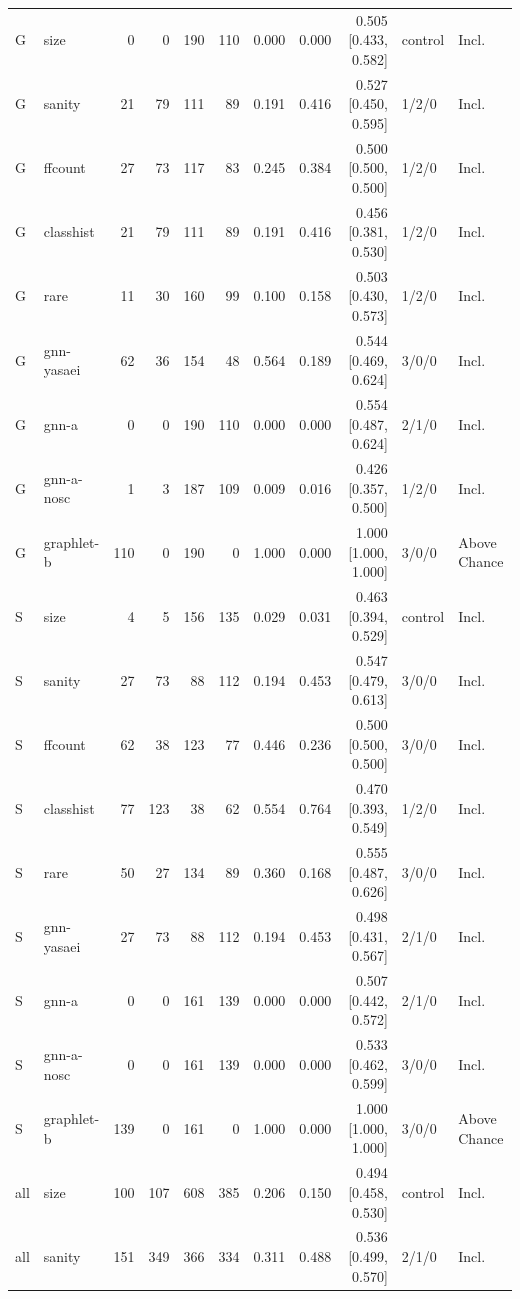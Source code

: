 \begin{tabular}{@{}llrrrrrrrll@{}}
\midrule
G & size & 0 & 0 & 190 & 110 & 0.000 & 0.000 & 0.505 [0.433, 0.582] & control & Incl. \\
G & sanity & 21 & 79 & 111 & 89 & 0.191 & 0.416 & 0.527 [0.450, 0.595] & 1/2/0 & Incl. \\
G & ffcount & 27 & 73 & 117 & 83 & 0.245 & 0.384 & 0.500 [0.500, 0.500] & 1/2/0 & Incl. \\
G & classhist & 21 & 79 & 111 & 89 & 0.191 & 0.416 & 0.456 [0.381, 0.530] & 1/2/0 & Incl. \\
G & rare & 11 & 30 & 160 & 99 & 0.100 & 0.158 & 0.503 [0.430, 0.573] & 1/2/0 & Incl. \\
G & gnn-yasaei & 62 & 36 & 154 & 48 & 0.564 & 0.189 & 0.544 [0.469, 0.624] & 3/0/0 & Incl. \\
G & gnn-a & 0 & 0 & 190 & 110 & 0.000 & 0.000 & 0.554 [0.487, 0.624] & 2/1/0 & Incl. \\
G & gnn-a-nosc & 1 & 3 & 187 & 109 & 0.009 & 0.016 & 0.426 [0.357, 0.500] & 1/2/0 & Incl. \\
G & graphlet-b & 110 & 0 & 190 & 0 & 1.000 & 0.000 & 1.000 [1.000, 1.000] & 3/0/0 & Above Chance \\
\midrule
S & size & 4 & 5 & 156 & 135 & 0.029 & 0.031 & 0.463 [0.394, 0.529] & control & Incl. \\
S & sanity & 27 & 73 & 88 & 112 & 0.194 & 0.453 & 0.547 [0.479, 0.613] & 3/0/0 & Incl. \\
S & ffcount & 62 & 38 & 123 & 77 & 0.446 & 0.236 & 0.500 [0.500, 0.500] & 3/0/0 & Incl. \\
S & classhist & 77 & 123 & 38 & 62 & 0.554 & 0.764 & 0.470 [0.393, 0.549] & 1/2/0 & Incl. \\
S & rare & 50 & 27 & 134 & 89 & 0.360 & 0.168 & 0.555 [0.487, 0.626] & 3/0/0 & Incl. \\
S & gnn-yasaei & 27 & 73 & 88 & 112 & 0.194 & 0.453 & 0.498 [0.431, 0.567] & 2/1/0 & Incl. \\
S & gnn-a & 0 & 0 & 161 & 139 & 0.000 & 0.000 & 0.507 [0.442, 0.572] & 2/1/0 & Incl. \\
S & gnn-a-nosc & 0 & 0 & 161 & 139 & 0.000 & 0.000 & 0.533 [0.462, 0.599] & 3/0/0 & Incl. \\
S & graphlet-b & 139 & 0 & 161 & 0 & 1.000 & 0.000 & 1.000 [1.000, 1.000] & 3/0/0 & Above Chance \\
\midrule
all & size & 100 & 107 & 608 & 385 & 0.206 & 0.150 & 0.494 [0.458, 0.530] & control & Incl. \\
all & sanity & 151 & 349 & 366 & 334 & 0.311 & 0.488 & 0.536 [0.499, 0.570] & 2/1/0 & Incl. \\

\end{tabular}
